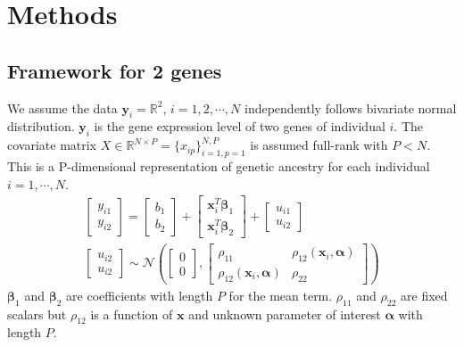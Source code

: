 \documentclass[aoas,preprint]{imsart}
\numberwithin{equation}{section}
\theoremstyle{plain}
\begin{document}
\section{Methods}
\subsection{Framework for 2 genes \label{sec:framework2}}
We assume the data $\bm{y}_i = \mathbb{R}^2$, $i = 1, 2, \cdots, N$ independently follows bivariate normal distribution. $\bm{y}_i$ is the gene expression level of two genes of individual $i$. The covariate matrix $X \in \mathbb{R}^{N \times P} = \{x_{ip}\}_{i=1,p=1}^{N,P}$ is assumed full-rank with $P < N$. This is a P-dimensional representation of genetic ancestry for each individual $i = 1, \cdots, N$. 
\begin{equation}
\begin{multlined}
    \begin{bmatrix} y_{i1} \\ y_{i2} \end{bmatrix} = 
    \begin{bmatrix} b_{1} \\ b_{2} \end{bmatrix} + 
    \begin{bmatrix} \bm{x}_i^T \bm{\beta}_1 \\ \bm{x}_i^T \bm{\beta}_2 \end{bmatrix} + 
    \begin{bmatrix} {u_{i1}} \\ {u_{i2}} \end{bmatrix}\\
    \begin{bmatrix} {u_{i2}} \\ u_{i2} \end{bmatrix} 
    \sim \mathcal{N}\left(
        \begin{bmatrix} 0 \\ 0 \end{bmatrix}, 
        \begin{bmatrix} \rho_{11} & \rho_{12}(\bm{x}_i, \bm{\alpha}) \\ 
        \rho_{12}(\bm{x}_i, \bm{\alpha}) & \rho_{22} \end{bmatrix}
    \right)
    \end{multlined}
    \label{eq:framework_2genes}
\end{equation}
$\bm{\beta}_1$ and $\bm{\beta}_2$ are coefficients with length $P$  for the mean term. $\rho_{11}$ and $\rho_{22}$ are fixed scalars but $\rho_{12}$ is a function of $\bm{x}$ and unknown parameter of interest $\bm{\alpha}$ with length $P$. \\
\end{document}

